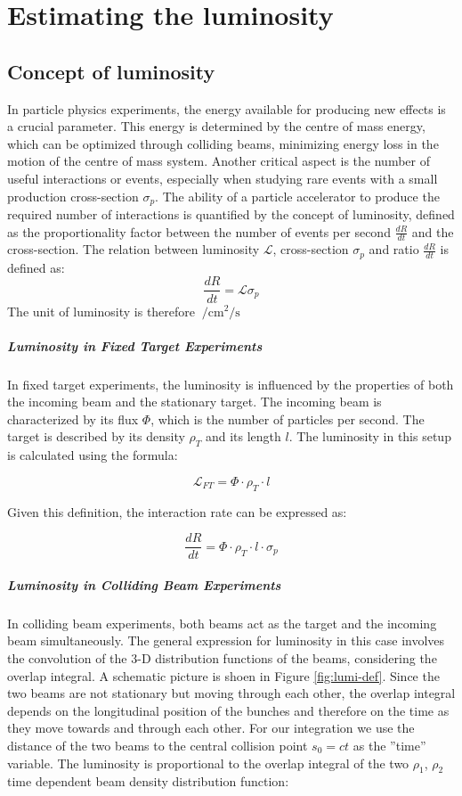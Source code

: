 \chapter{Estimating the luminosity}
\section{Concept of luminosity}
In particle physics experiments, the energy available for producing new effects is a crucial parameter. This energy is determined by the centre of mass energy, which can be optimized through colliding beams, minimizing energy loss in the motion of the centre of mass system. Another critical aspect is the number of useful interactions or events, especially when studying rare events with a small production cross-section $\sigma_p$. The ability of a particle accelerator to produce the required number of interactions is quantified by the concept of luminosity, defined as the proportionality factor between the number of events per second $\tfrac{dR}{dt}$ and the cross-section. The relation between luminosity $\mathcal{L}$, cross-section $\sigma_p$ and ratio $\tfrac{dR}{dt}$ is defined as:
\begin{equation}
    \frac{dR}{dt} = \mathcal{L}{\sigma_p}
\end{equation}
The unit of luminosity is therefore $\SI{}{\per\centi\meter\squared\per\second}$
\paragraph{Luminosity in Fixed Target Experiments}
In fixed target experiments, the luminosity is influenced by the properties of both the incoming beam and the stationary target. The incoming beam is characterized by its flux $\Phi$, which is the number of particles per second. The target is described by its density $\rho_T$ and its length $l$. The luminosity in this setup is calculated using the formula:

\[
\mathcal{L}_{FT} = \Phi \cdot \rho_T \cdot l
\]

Given this definition, the interaction rate can be expressed as:

\[
\frac{dR}{dt} = \Phi \cdot \rho_T \cdot l \cdot \sigma_p
\]

\paragraph{Luminosity in Colliding Beam Experiments}
In colliding beam experiments, both beams act as the target and the incoming beam simultaneously. The general expression for luminosity in this case involves the convolution of the 3-D distribution functions of the beams, considering the overlap integral. A schematic picture is shoen in Figure \ref{fig:lumi-def}. Since the two beams are not stationary but moving through each other, the overlap integral depends on the longitudinal position of the bunches and therefore on the time as they move towards and through each other. For our integration we use the distance of the two beams to the central collision point $s_0 = ct$ as the ”time” variable. 
The luminosity is proportional to the overlap integral of the two  $\rho_1$, $\rho_2$ time dependent beam density distribution function:

